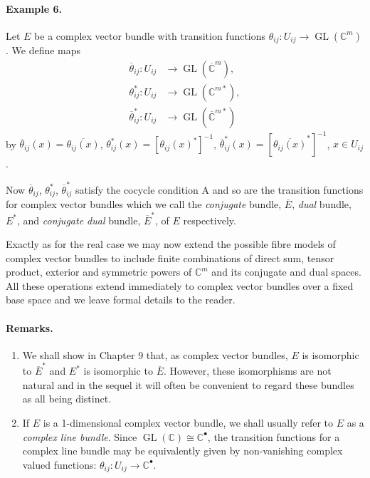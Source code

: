 \paragraph*{Example 6.} Let $E$ be a complex vector bundle with transition functions $\theta_{ij}:U_{ij}\to\operatorname{GL}(\mathbb C^m)$. We define maps
\begin{align*}
\overline\theta_{ij}:U_{ij}&\longrightarrow\operatorname{GL}(\overline{\mathbb C}^m),\\
\theta_{ij}^*:U_{ij}&\longrightarrow\operatorname{GL}(\mathbb C^{m*}),\\
\overline\theta_{ij}^*:U_{ij}&\longrightarrow\operatorname{GL}(\overline{\mathbb C}^{m*})
\end{align*}
by $\overline\theta_{ij}(x)=\overline{\theta_{ij}(x)}$, $\theta_{ij}^*(x)=[\theta_{ij}(x)^*]^{-1}$, $\overline\theta_{ij}^*(x)=[\overline{\theta_{ij}(x)}^*]^{-1}$, $x\in U_{ij}$.

Now $\overline\theta_{ij}$, $\theta_{ij}^*$, $\overline\theta_{ij}^*$ satisfy the cocycle condition A and so are the transition functions for complex vector bundles which we call the \emph{conjugate} bundle, $\overline E$, \emph{dual} bundle, $E^*$, and \emph{conjugate dual} bundle, $\overline E^*$, of $E$ respectively.

Exactly as for the real case we may now extend the possible fibre models of complex vector bundles to include finite combinations of direct sum, tensor product, exterior and symmetric powers of $\mathbb C^m$ and its conjugate and dual spaces. All these operations extend immediately to complex vector bundles over a fixed base space and we leave formal details to the reader.

\paragraph*{Remarks.}
\begin{enumerate}
\item We shall show in Chapter 9 that, as complex vector bundles, $E$ is isomorphic to $\overline E^*$ and $E^*$ is isomorphic to $\overline E$. However, these isomorphisms are not natural and in the sequel it will often be convenient to regard these bundles as all being distinct.
\item If $E$ is a 1-dimensional complex vector bundle, we shall usually refer to $E$ as a \emph{complex line bundle}. Since $\operatorname{GL}(\mathbb C)\cong\mathbb C^\bullet$, the transition functions for a complex line bundle may be equivalently given by non-vanishing complex valued functions: $\theta_{ij}:U_{ij}\to\mathbb C^\bullet$.
\end{enumerate}
